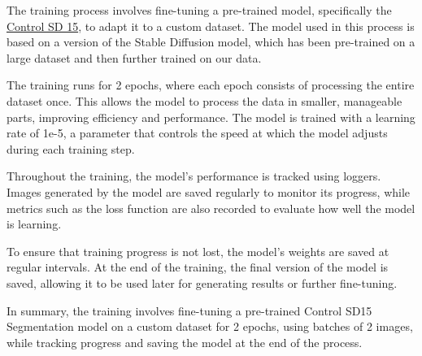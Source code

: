 \documentclass[12pt,a4paper]{report}
\begin{document}
The training process involves fine-tuning a pre-trained model, specifically the \href {https://huggingface.co/lllyasviel/ControlNet/blob/main/models/control_sd15_seg.pth} {Control SD 15}, to adapt it to a custom dataset. The model used in this process is based on a version of the Stable Diffusion model, which has been pre-trained on a large dataset and then further trained on our data.

The training runs for 2 epochs, where each epoch consists of processing the entire dataset once. This allows the model to process the data in smaller, manageable parts, improving efficiency and performance. The model is trained with a learning rate of 1e-5, a parameter that controls the speed at which the model adjusts during each training step.

Throughout the training, the model’s performance is tracked using loggers. Images generated by the model are saved regularly to monitor its progress, while metrics such as the loss function are also recorded to evaluate how well the model is learning.

To ensure that training progress is not lost, the model's weights are saved at regular intervals. At the end of the training, the final version of the model is saved, allowing it to be used later for generating results or further fine-tuning.

In summary, the training involves fine-tuning a pre-trained Control SD15 Segmentation model on a custom dataset for 2 epochs, using batches of 2 images, while tracking progress and saving the model at the end of the process.
\end{document}
